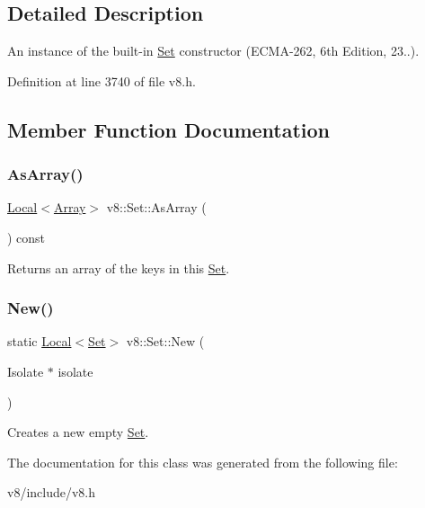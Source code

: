 \subsection{Detailed Description}
An instance of the built-\/in \mbox{\hyperlink{classv8_1_1Set}{Set}} constructor (E\+C\+M\+A-\/262, 6th Edition, 23..). 

Definition at line 3740 of file v8.\+h.



\subsection{Member Function Documentation}
\mbox{\label{classv8_1_1Set_aa4e8576e0a657bcd61364f3bc26e2b56}} 
\subsubsection{\texorpdfstring{As\+Array()}{AsArray()}}
{\footnotesize\ttfamily \mbox{\hyperlink{classv8_1_1Local}{Local}}$<$\mbox{\hyperlink{classv8_1_1Array}{Array}}$>$ v8\+::\+Set\+::\+As\+Array (\begin{DoxyParamCaption}{ }\end{DoxyParamCaption}) const}

Returns an array of the keys in this \mbox{\hyperlink{classv8_1_1Set}{Set}}. \mbox{\label{classv8_1_1Set_a036e773566a36997a79e78ef0a4103a1}} 
\subsubsection{\texorpdfstring{New()}{New()}}
{\footnotesize\ttfamily static \mbox{\hyperlink{classv8_1_1Local}{Local}}$<$\mbox{\hyperlink{classv8_1_1Set}{Set}}$>$ v8\+::\+Set\+::\+New (\begin{DoxyParamCaption}\item[{Isolate $\ast$}]{isolate }\end{DoxyParamCaption})\hspace{0.3cm}{\ttfamily [static]}}

Creates a new empty \mbox{\hyperlink{classv8_1_1Set}{Set}}. 

The documentation for this class was generated from the following file\+:\begin{DoxyCompactItemize}
\item 
v8/include/v8.\+h\end{DoxyCompactItemize}
